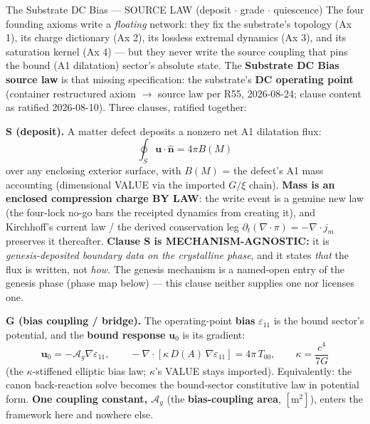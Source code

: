 \begin{resultbox}{The Substrate DC Bias — SOURCE LAW (deposit $\cdot$ grade $\cdot$ quiescence)}
The four founding axioms write a \emph{floating} network: they fix the substrate's topology (Ax 1), its charge dictionary (Ax 2), its lossless extremal dynamics (Ax 3), and its saturation kernel (Ax 4) --- but they never write the source coupling that pins the bound (A1 dilatation) sector's absolute state. The \textbf{Substrate DC Bias source law} is that missing specification: the substrate's \textbf{DC operating point} (container restructured axiom $\to$ source law per R55, 2026-08-24; clause content as ratified 2026-08-10). Three clauses, ratified together:

\medskip\noindent\textbf{S (deposit).} A matter defect deposits a nonzero net A1 dilatation flux:
\begin{equation}
    \oint_S \mathbf{u}\cdot\hat{\mathbf{n}} = 4\pi B(M)
    \label{eq:axiom5_deposit}
\end{equation}
over any enclosing exterior surface, with $B(M)$ = the defect's A1 mass accounting (dimensional VALUE via the imported $G/\xi$ chain). \textbf{Mass is an enclosed compression charge BY LAW}: the write event is a genuine new law (the four-lock no-go bars the receipted dynamics from creating it), and Kirchhoff's current law / the derived conservation leg $\partial_t(\nabla\cdot\pi) = -\nabla\cdot j_m$ preserves it thereafter. \textbf{Clause S is MECHANISM-AGNOSTIC:} it is \emph{genesis-deposited boundary data on the crystalline phase}, and it states \emph{that} the flux is written, not \emph{how}. The genesis mechanism is a named-open entry of the genesis phase (phase map below) --- this clause neither supplies one nor licenses one.

\medskip\noindent\textbf{G (bias coupling / bridge).} The operating-point \textbf{bias} $\varepsilon_{11}$ is the bound sector's potential, and the \textbf{bound response} $\mathbf{u}_0$ is its gradient:
\begin{equation}
    \mathbf{u}_0 = -\mathcal{A}_g\nabla\varepsilon_{11},\qquad
    -\nabla\cdot\!\left[\kappa\, D(A)\,\nabla\varepsilon_{11}\right] = 4\pi\,T_{00},\qquad
    \kappa = \frac{c^4}{7G}
    \label{eq:axiom5_bridge}
\end{equation}
(the $\kappa$-stiffened elliptic bias law; $\kappa$'s VALUE stays imported). Equivalently: the canon back-reaction solve becomes the bound-sector constitutive law in potential form. \textbf{One coupling constant, $\mathcal{A}_g$} (the \textbf{bias-coupling area}, $[\mathrm{m}^2]$), enters the framework here and nowhere else.


\end{resultbox}
